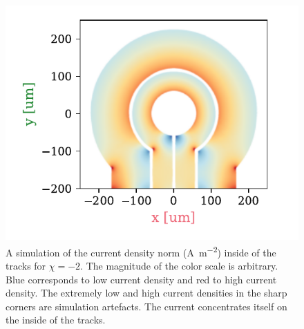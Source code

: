 \begin{figure}
    \centering
    \includegraphics{figures/current_through_tracks.pdf}
    \caption{A simulation of the current density norm (\unit{\ampere\per\square\meter}) inside of the tracks for $\chi = -2$. The magnitude of the color scale is arbitrary. Blue corresponds to low current density and red to high current density. The extremely low and high current densities in the sharp corners are simulation artefacts. The current concentrates itself on the inside of the tracks.}
    \label{fig:current_through_tracks}
\end{figure}
